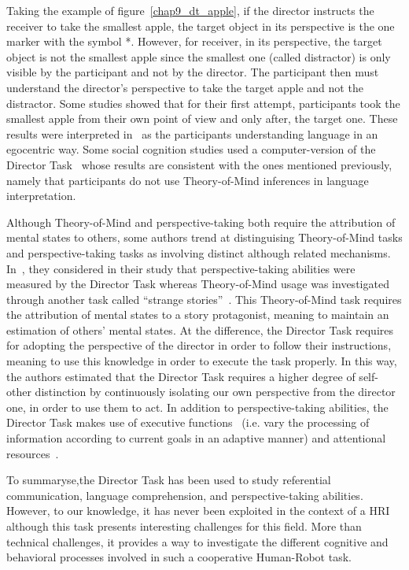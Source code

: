Taking the example of figure~\ref{chap9_dt_apple}, if the director instructs the receiver to take the smallest apple, the target object in its perspective is the one marker with the symbol *. However, for receiver, in its perspective, the target object is not the smallest apple since the smallest one (called distractor) is only visible by the participant and not by the director. The participant then must understand the director's perspective to take the target apple and not the distractor. Some studies showed that for their first attempt, participants took the smallest apple from their own point of view and only after, the target one. These results were interpreted in~\cite{keysar_1994_illusory, keysar_1998_egocentric, keysar_2002_self, keysar_2003_limits} as the participants understanding language in an egocentric way. Some social cognition studies used a computer-version of the Director Task~\cite{dumontheil_2010_online} whose results are consistent with the ones mentioned previously, namely that participants do not use Theory-of-Mind inferences in language interpretation.

Although Theory-of-Mind and perspective-taking both require the attribution of mental states to others, some authors trend at distinguising Theory-of-Mind tasks and perspective-taking tasks as involving distinct although related mechanisms. In~\cite{santiesteban_2012_training}, they considered in their study that perspective-taking abilities were measured by the Director Task whereas Theory-of-Mind usage was investigated through another task called ``strange stories''~\cite{happe_1994_advanced}. This Theory-of-Mind task requires the attribution of mental states to a story protagonist, meaning to maintain an estimation of others' mental states. At the difference, the Director Task requires for adopting the perspective of the director in order to follow their instructions, meaning to use this knowledge in order to execute the task properly. 
In this way, the authors estimated that the Director Task requires a higher degree of self-other distinction by continuously isolating our own perspective from the director one, in order to use them to act. In addition to perspective-taking abilities, the Director Task makes use of executive functions~\cite{rubio_2017_director} (i.e. vary the processing of information according to current goals in an adaptive manner) and attentional resources~\cite{lin_2010_reflexively}.

To summaryse,the Director Task has been used to study referential communication, language comprehension, and perspective-taking abilities. However, to our knowledge, it has never been exploited in the context of a HRI although this task presents interesting challenges for this field. More than technical challenges, it provides a way to investigate the different cognitive and behavioral processes involved in such a cooperative Human-Robot task.

